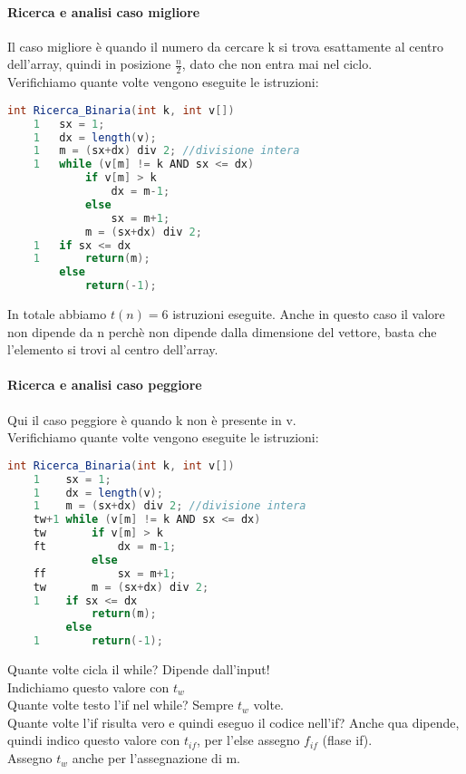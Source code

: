 \paragraph*{Ricerca e analisi caso migliore} Il caso migliore è quando il numero da cercare k si trova
esattamente al centro dell'array, quindi in posizione $\frac{n}{2}$, dato che non entra mai nel ciclo.\\
Verifichiamo quante volte vengono eseguite le istruzioni:
\begin{lstlisting}[language=Java]
    int Ricerca_Binaria(int k, int v[])
    1   sx = 1;
    1   dx = length(v);
    1   m = (sx+dx) div 2; //divisione intera
    1   while (v[m] != k AND sx <= dx)
            if v[m] > k
                dx = m-1;
            else 
                sx = m+1;
            m = (sx+dx) div 2;
    1   if sx <= dx
    1       return(m);
        else
            return(-1);
\end{lstlisting}
In totale abbiamo $t(n) = 6$ istruzioni eseguite. Anche in questo caso il valore non
dipende da n perchè non dipende dalla dimensione del vettore, basta che l'elemento
si trovi al centro dell'array.
\paragraph*{Ricerca e analisi caso peggiore}
Qui il caso peggiore è quando k non è presente in v.\\
Verifichiamo quante volte vengono eseguite le istruzioni:
\begin{lstlisting}[language=Java]
    int Ricerca_Binaria(int k, int v[])
    1    sx = 1;
    1    dx = length(v);
    1    m = (sx+dx) div 2; //divisione intera
    tw+1 while (v[m] != k AND sx <= dx)
    tw       if v[m] > k
    ft           dx = m-1;
             else 
    ff           sx = m+1;
    tw       m = (sx+dx) div 2;
    1    if sx <= dx
             return(m);
         else
    1        return(-1);
\end{lstlisting}
Quante volte cicla il while? Dipende dall'input!\\
Indichiamo questo valore con $t_w$\\
Quante volte testo l'if nel while? Sempre $t_w$ volte.\\
Quante volte l'if risulta vero e quindi eseguo il codice nell'if? Anche qua dipende, quindi
indico questo valore con $t_{if}$, per l'else assegno $f_{if}$ (flase if).\\
Assegno $t_w$ anche per l'assegnazione di m.\\
